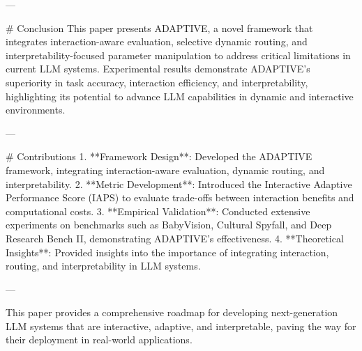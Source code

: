 ---

# Conclusion  
This paper presents ADAPTIVE, a novel framework that integrates interaction-aware evaluation, selective dynamic routing, and interpretability-focused parameter manipulation to address critical limitations in current LLM systems. Experimental results demonstrate ADAPTIVE's superiority in task accuracy, interaction efficiency, and interpretability, highlighting its potential to advance LLM capabilities in dynamic and interactive environments.

---

# Contributions  
1. **Framework Design**: Developed the ADAPTIVE framework, integrating interaction-aware evaluation, dynamic routing, and interpretability.
2. **Metric Development**: Introduced the Interactive Adaptive Performance Score (IAPS) to evaluate trade-offs between interaction benefits and computational costs.
3. **Empirical Validation**: Conducted extensive experiments on benchmarks such as BabyVision, Cultural Spyfall, and Deep Research Bench II, demonstrating ADAPTIVE's effectiveness.
4. **Theoretical Insights**: Provided insights into the importance of integrating interaction, routing, and interpretability in LLM systems.

--- 

This paper provides a comprehensive roadmap for developing next-generation LLM systems that are interactive, adaptive, and interpretable, paving the way for their deployment in real-world applications.